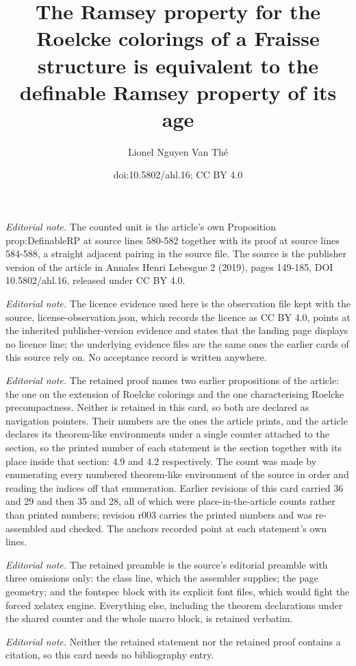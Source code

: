 \documentclass[10pt,a4paper]{article}
\title{The Ramsey property for the Roelcke colorings of a Fraisse structure is equivalent to the definable Ramsey property of its age}
\author{Lionel Nguyen Van Thé}
\date{doi:10.5802/ahl.16; CC BY 4.0}
\theoremstyle{definition}
\numberwithin{equation}{section}
\numberwithin{figure}{section}
\numberwithin{table}{section}
\begin{document}
\maketitle
\noindent\textit{Editorial note.} The counted unit is the article's own Proposition prop:DefinableRP at source lines 580-582 together with its proof at source lines 584-588, a straight adjacent pairing in the source file. The source is the publisher version of the article in Annales Henri Lebesgue 2 (2019), pages 149-185, DOI 10.5802/ahl.16, released under CC BY 4.0.\par\medskip
\noindent\textit{Editorial note.} The licence evidence used here is the observation file kept with the source, license-observation.json, which records the licence as CC BY 4.0, points at the inherited publisher-version evidence and states that the landing page displays no licence line; the underlying evidence files are the same ones the earlier cards of this source rely on. No acceptance record is written anywhere.\par\medskip
\noindent\textit{Editorial note.} The retained proof names two earlier propositions of the article: the one on the extension of Roelcke colorings and the one characterising Roelcke precompactness. Neither is retained in this card, so both are declared as navigation pointers. Their numbers are the ones the article prints, and the article declares its theorem-like environments under a single counter attached to the section, so the printed number of each statement is the section together with its place inside that section: 4.9 and 4.2 respectively. The count was made by enumerating every numbered theorem-like environment of the source in order and reading the indices off that enumeration. Earlier revisions of this card carried 36 and 29 and then 35 and 28, all of which were place-in-the-article counts rather than printed numbers; revision r003 carries the printed numbers and was re-assembled and checked. The anchors recorded point at each statement's own lines.\par\medskip
\noindent\textit{Editorial note.} The retained preamble is the source's editorial preamble with three omissions only: the class line, which the assembler supplies; the page geometry; and the fontspec block with its explicit font files, which would fight the forced xelatex engine. Everything else, including the theorem declarations under the shared counter and the whole macro block, is retained verbatim.\par\medskip
\noindent\textit{Editorial note.} Neither the retained statement nor the retained proof contains a citation, so this card needs no bibliography entry.\par\medskip
\end{document}
